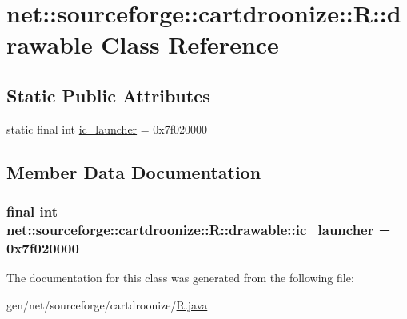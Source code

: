 \hypertarget{classnet_1_1sourceforge_1_1cartdroonize_1_1R_1_1drawable}{
\section{net::sourceforge::cartdroonize::R::drawable Class Reference}
\label{classnet_1_1sourceforge_1_1cartdroonize_1_1R_1_1drawable}
}
\subsection*{Static Public Attributes}
\begin{DoxyCompactItemize}
\item 
static final int \hyperlink{classnet_1_1sourceforge_1_1cartdroonize_1_1R_1_1drawable_add25e5fac24702413fc18f5f0e8c67bf}{ic\_\-launcher} = 0x7f020000
\end{DoxyCompactItemize}


\subsection{Member Data Documentation}
\hypertarget{classnet_1_1sourceforge_1_1cartdroonize_1_1R_1_1drawable_add25e5fac24702413fc18f5f0e8c67bf}{
\subsubsection[{ic\_\-launcher}]{\setlength{\rightskip}{0pt plus 5cm}final int {\bf net::sourceforge::cartdroonize::R::drawable::ic\_\-launcher} = 0x7f020000}}
\label{classnet_1_1sourceforge_1_1cartdroonize_1_1R_1_1drawable_add25e5fac24702413fc18f5f0e8c67bf}


The documentation for this class was generated from the following file:\begin{DoxyCompactItemize}
\item 
gen/net/sourceforge/cartdroonize/\hyperlink{R_8java}{R.java}\end{DoxyCompactItemize}
